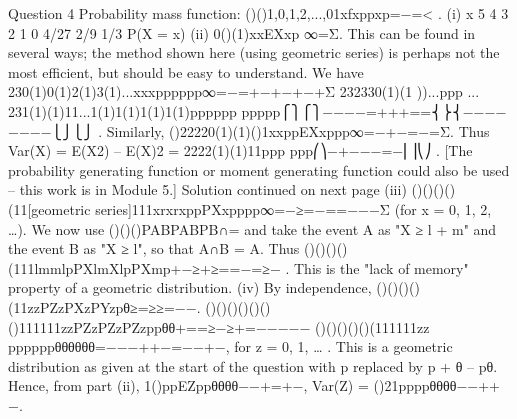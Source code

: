 Question 4
Probability mass function: ()()1,0,1,2,...,01xfxppxp=−=< .
(i)
x
5
4
3
2
1
0
4/27
2/9
1/3
P(X = x)
(ii) 0()(1)xxEXxp
∞=Σ. This can be found in several ways; the method shown here (using geometric series) is perhaps not the most efficient, but should be easy to understand. We have
{}230(1)0(1)2(1)3(1)...xxxpppppp∞=−=+−+−+−+Σ
23233{0(1)(1
))...ppp
...} 231(1)(1)11...1(1)1(1)1(1)1(1)pppppp ppppp⎧⎫⎧⎫−−−−=+++==⎨⎬⎨−−−−−−−−⎩⎭⎩⎭ .
Similarly, ()22220(1)(1)()1xxppEXxppp∞=−+−=−=Σ.
Thus Var(X) = E(X2) – {E(X)}2 = 2222(1)(1)11ppp ppp⎛⎞−+−−−=−⎜⎟⎝⎠ .
[The probability generating function or moment generating function could also be used – this work is in Module 5.]
Solution continued on next page
(iii) ()()()()(11[geometric series]111xrxrxppPXxpppp∞=−≥=−==−−−Σ (for x = 0, 1, 2, …). We now use ()()()PABPABPB∩= and take the event A as "X ≥ l + m" and the event B as "X ≥ l", so that A∩B = A. Thus ()()()()(111lmmlpPXlmXlpPXmp+−≥+≥==−=≥− .
This is the "lack of memory" property of a geometric distribution.
(iv) By independence, ()()()()(11zzPZzPXzPYzpθ≥=≥≥=−−.
()()()()(){}()(){}111111zzPZzPZzPZzppθθ+==≥−≥+=−−−−−
()(){}()()(){}(111111zz ppppppθθθθθθ=−−−++−=−−+−, for z = 0, 1, … .
This is a geometric distribution as given at the start of the question with p replaced by p + θ – pθ. Hence, from part (ii), 1()ppEZppθθθθ−−+=+−, Var(Z) = ()21ppppθθθθ−−++−.